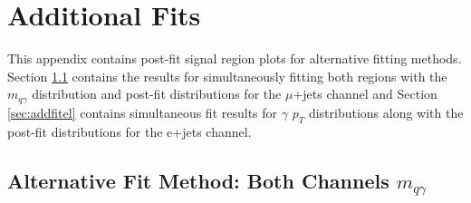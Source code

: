 \chapter{Additional Fits}
\label{app:AddFits}
%
%
This appendix contains post-fit signal region plots for alternative fitting methods.  Section \ref{sec:addfitmu} contains the results for simultaneously fitting both regions with the $m_{q\gamma}$ distribution and post-fit distributions for the $\mu$+jets channel and Section \ref{sec:addfitel} contains simultaneous fit results for $\gamma$  $p_T$ distributions along with the post-fit distributions for the e+jets channel.

\section{Alternative Fit Method: Both Channels $m_{q\gamma}$}
\label{sec:addfitmu}

